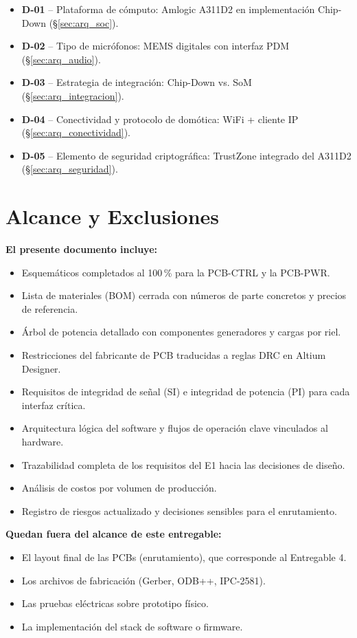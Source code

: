 \begin{itemize}
  \item \textbf{D-01} -- Plataforma de cómputo: Amlogic A311D2 en implementación Chip-Down (\S\ref{sec:arq_soc}).
  \item \textbf{D-02} -- Tipo de micrófonos: MEMS digitales con interfaz PDM (\S\ref{sec:arq_audio}).
  \item \textbf{D-03} -- Estrategia de integración: Chip-Down vs. SoM (\S\ref{sec:arq_integracion}).
  \item \textbf{D-04} -- Conectividad y protocolo de domótica: WiFi + cliente IP (\S\ref{sec:arq_conectividad}).
  \item \textbf{D-05} -- Elemento de seguridad criptográfica: TrustZone integrado del A311D2 (\S\ref{sec:arq_seguridad}).
\end{itemize}

\section{Alcance y Exclusiones}
\label{sec:intro_alcance}

\textbf{El presente documento incluye:}
\begin{itemize}
  \item Esquemáticos completados al 100\,\% para la PCB-CTRL y la PCB-PWR.
  \item Lista de materiales (BOM) cerrada con números de parte concretos y precios de referencia.
  \item Árbol de potencia detallado con componentes generadores y cargas por riel.
  \item Restricciones del fabricante de PCB traducidas a reglas DRC en Altium Designer.
  \item Requisitos de integridad de señal (SI) e integridad de potencia (PI) para cada interfaz crítica.
  \item Arquitectura lógica del software y flujos de operación clave vinculados al hardware.
  \item Trazabilidad completa de los requisitos del E1 hacia las decisiones de diseño.
  \item Análisis de costos por volumen de producción.
  \item Registro de riesgos actualizado y decisiones sensibles para el enrutamiento.
\end{itemize}

\textbf{Quedan fuera del alcance de este entregable:}
\begin{itemize}
  \item El layout final de las PCBs (enrutamiento), que corresponde al Entregable 4.
  \item Los archivos de fabricación (Gerber, ODB++, IPC-2581).
  \item Las pruebas eléctricas sobre prototipo físico.
  \item La implementación del stack de software o firmware.
\end{itemize}

